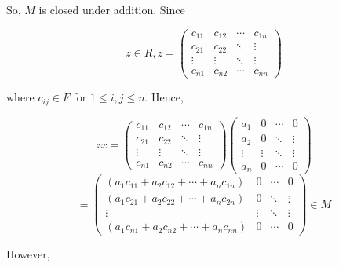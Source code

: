 \begin{solution}
    So, $M$ is closed under addition. Since 
    
    $$z\in R, z=\left(\begin{array}{cccc} c_{11} & c_{12} & \cdots & c_{1n}
                                         \\ c_{21} & c_{22} & \ddots & \vdots
                                         \\ \vdots & \vdots & \ddots & \vdots
                                         \\ c_{n1} & c_{n2} & \cdots & c_{nn} \end{array}\right)$$
    
    where $c_{ij}\in F$ for $1\leq i,j\leq n$. Hence,

    $$zx=\left(\begin{array}{cccc} c_{11} & c_{12} & \cdots & c_{1n}\\ c_{21} & c_{22} & \ddots & \vdots
                                                  \\ \vdots & \vdots & \ddots & \vdots 
                                                  \\ c_{n1} & c_{n2} & \cdots & c_{nn}
         \end{array}\right)
         \left(\begin{array}{cccc} a_1 & 0 & \cdots & 0 \\ a_2 & 0 & \ddots & \vdots
                                \\ \vdots & \vdots & \ddots & \vdots \\ a_n & 0 & \cdots & 0
         \end{array}\right)$$
    $$=\left(\begin{array}{cccc} (a_1c_{11}+a_2c_{12}+\cdots+a_nc_{1n}) & 0 & \cdots & 0
                              \\ (a_1c_{21}+a_2c_{22}+\cdots+a_nc_{2n}) & 0 & \ddots & \vdots
                              \\ \vdots & \vdots & \ddots & \vdots
                              \\ (a_1c_{n1}+a_2c_{n2}+\cdots+a_nc_{nn}) & 0 & \cdots & 0
        \end{array}\right)\in M$$
    
    However,


\end{solution}
